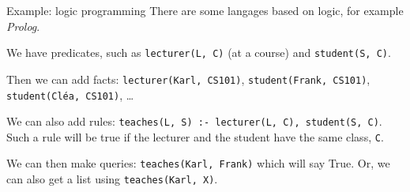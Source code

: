 \documentclass{article}
\begin{document}
\begin{parag}{Example: logic programming}
    There are some langages based on logic, for example \textit{Prolog}.

    We have predicates, such as \texttt{lecturer(L, C)} (at a course) and \texttt{student(S, C)}.

    Then we can add facts: \texttt{lecturer(Karl, CS101)}, \texttt{student(Frank, CS101)}, \texttt{student(Cléa, CS101)}, \ldots

    We can also add rules: \texttt{teaches(L, S) :- lecturer(L, C), student(S, C)}. Such a rule will be true if the lecturer and the student have the same class, \texttt{C}.

    We can then make queries: \texttt{teaches(Karl, Frank)} which will say True. Or, we can also get a list using \texttt{teaches(Karl, X)}.
\end{parag}
\end{document}
